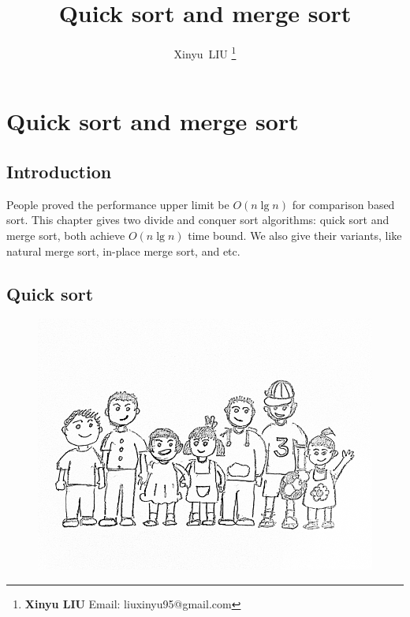\documentclass[b5paper]{article}
\begin{document}
\title{Quick sort and merge sort}

\author{Xinyu~LIU
\thanks{{\bfseries Xinyu LIU} \newline
  Email: liuxinyu95@gmail.com \newline}
  }

\maketitle
\fi


\ifx\wholebook\relax
\chapter{Quick sort and merge sort}
\fi

\section{Introduction}
\label{introduction}

People proved the performance upper limit be $O(n \lg n)$ for comparison based sort\cite{TAOCP}. This chapter gives two divide and conquer sort algorithms: quick sort and merge sort, both achieve $O(n \lg n)$ time bound. We also give their variants, like natural merge sort, in-place merge sort, and etc.

\section{Quick sort}

\begin{figure}[htbp]
 \centering
 \includegraphics[scale=0.3]{img/kids}
 \captionsetup{labelformat = empty}
 \label{fig:knuth-ssort}
\end{figure}
\end{document}
